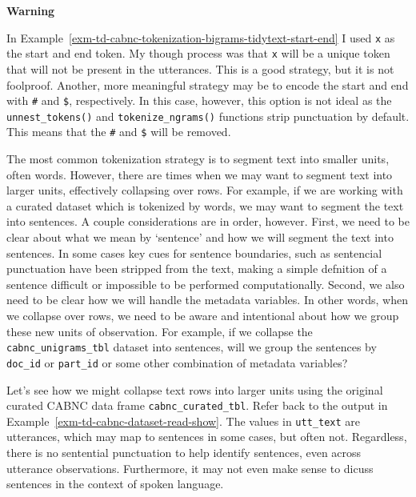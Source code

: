 \documentclass[
  letterpaper,
  DIV=11,
  numbers=noendperiod]{scrreport}
\theoremstyle{definition}
\theoremstyle{remark}
\begin{document}
\begin{tcolorbox}[enhanced jigsaw, leftrule=.75mm, bottomrule=.15mm, opacityback=0, breakable, left=2mm, colback=white, toprule=.15mm, arc=.35mm, rightrule=.15mm]

\textbf{ Warning}

In Example~\ref{exm-td-cabnc-tokenization-bigrams-tidytext-start-end} I
used \texttt{x} as the start and end token. My though process was that
\texttt{x} will be a unique token that will not be present in the
utterances. This is a good strategy, but it is not foolproof. Another,
more meaningful strategy may be to encode the start and end with
\texttt{\#} and \texttt{\$}, respectively. In this case, however, this
option is not ideal as the \texttt{unnest\_tokens()} and
\texttt{tokenize\_ngrams()} functions strip punctuation by default. This
means that the \texttt{\#} and \texttt{\$} will be removed.

\end{tcolorbox}

The most common tokenization strategy is to segment text into smaller
units, often words. However, there are times when we may want to segment
text into larger units, effectively collapsing over rows. For example,
if we are working with a curated dataset which is tokenized by words, we
may want to segment the text into sentences. A couple considerations are
in order, however. First, we need to be clear about what we mean by
`sentence' and how we will segment the text into sentences. In some
cases key cues for sentence boundaries, such as sentencial punctuation
have been stripped from the text, making a simple defnition of a
sentence difficult or impossible to be performed computationally.
Second, we also need to be clear how we will handle the metadata
variables. In other words, when we collapse over rows, we need to be
aware and intentional about how we group these new units of observation.
For example, if we collapse the \texttt{cabnc\_unigrams\_tbl} dataset
into sentences, will we group the sentences by \texttt{doc\_id} or
\texttt{part\_id} or some other combination of metadata variables?

Let's see how we might collapse text rows into larger units using the
original curated CABNC data frame \texttt{cabnc\_curated\_tbl}. Refer
back to the output in Example~\ref{exm-td-cabnc-dataset-read-show}. The
values in \texttt{utt\_text} are utterances, which may map to sentences
in some cases, but often not. Regardless, there is no sentential
punctuation to help identify sentences, even across utterance
observations. Furthermore, it may not even make sense to dicuss
sentences in the context of spoken language.
\end{document}
